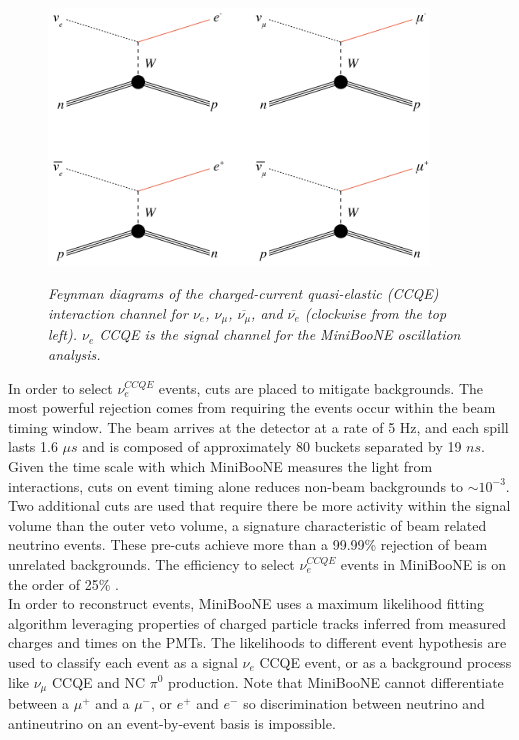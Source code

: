 \begin{figure}[ht!]
\centering
	\includegraphics[width=0.9\textwidth]{Figures/georgia_ccqe_feynman.png} \\
\caption{\textit{Feynman diagrams of the charged-current quasi-elastic (CCQE) interaction channel for $\nu_e$, $\nu_\mu$, $\overline{\nu_\mu}$, and $\overline{\nu_e}$ (clockwise from the top left). $\nu_e$ CCQE is the signal channel for the MiniBooNE oscillation analysis.}}\label{georgia_ccqe_feynman_fig}
\end{figure}


In order to select $\nu_e^{CCQE}$ events, cuts are placed to mitigate backgrounds. The most powerful rejection comes from requiring the events occur within the beam timing window. The beam arrives at the detector at a rate of 5 Hz, and each spill lasts 1.6 $\mu s$ and is composed of approximately 80 buckets separated by 19 $ns$. Given the time scale with which MiniBooNE measures the light from interactions, cuts on event timing alone reduces non-beam backgrounds to $\sim10^{-3}$. Two additional cuts are used that require there be more activity within the signal volume than the outer veto volume, a signature characteristic of beam related neutrino events. These pre-cuts achieve more than a 99.99\% rejection of beam unrelated backgrounds. The efficiency to select $\nu_e^{CCQE}$ events in MiniBooNE is on the order of 25\% \cite{JocelynMonroeThesis}.\\

In order to reconstruct events, MiniBooNE uses a maximum likelihood fitting algorithm leveraging properties of charged particle tracks inferred from measured charges and times on the PMTs. The likelihoods to different event hypothesis are used to classify each event as a signal $\nu_e$ CCQE event, or as a background process like $\nu_\mu$ CCQE and NC $\pi^0$ production. Note that MiniBooNE cannot differentiate between a $\mu^+$ and a $\mu^-$, or $e^+$ and $e^-$ so discrimination between neutrino and antineutrino on an event-by-event basis is impossible.\\

